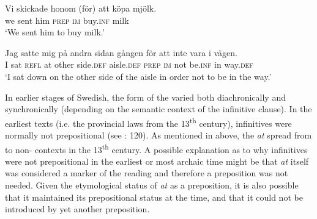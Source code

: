 \documentclass[output=paper]{langscibook}
\begin{document}
\ea {}\label{ex:kalm:8}
\ea \label{ex:kalm:8a}
\gll Vi skickade honom (för) att köpa mjölk.\\
we sent him \textsc{prep} \textsc{im} buy.\textsc{inf} milk\\
\glt ‘We sent him to buy milk.’

\ex  \label{ex:kalm:8b}
\gll Jag satte mig på andra sidan gången för att inte vara i vägen.\\
 I sat \textsc{refl} at other side.\textsc{def} aisle.\textsc{def} \textsc{prep} \textsc{im} not be.\textsc{inf} in way.\textsc{def}\\
\glt ‘I sat down on the other side of the aisle in order not to be in the way.’
\z 
\z 


In earlier stages of Swedish, the form of the  varied both diachronically and synchronically (depending on the semantic context of the infinitive clause). In the earliest  texts (i.e. the provincial laws from the 13\textsuperscript{th} century),  infinitives were normally not prepositional (see \citealt{Kalm2016Satsekvivalenta}: 120). As mentioned in  above, the  \textit{at} spread from  to non- contexts in the 13\textsuperscript{th} century. A possible explanation as to why  infinitives were not prepositional in the earliest or most archaic time might be that \textit{at} itself was considered a marker of the  reading and therefore a preposition was not needed. Given the etymological status of \textit{at} as a preposition, it is also possible that it maintained its prepositional status at the time, and that it could not be introduced by yet another preposition. 
\end{document}

